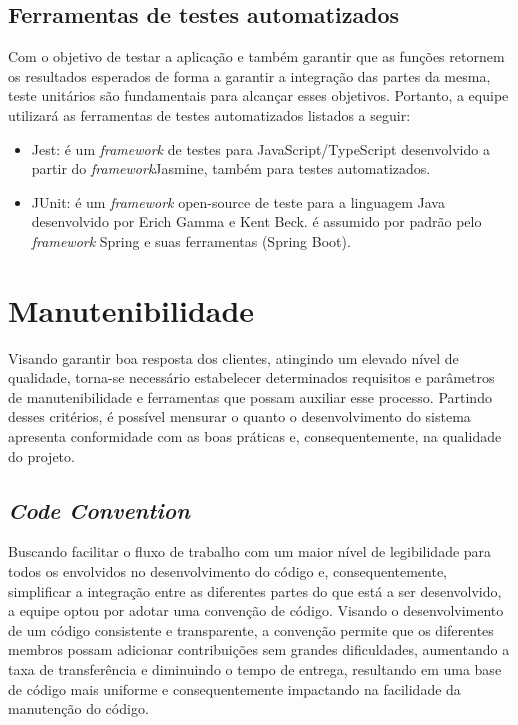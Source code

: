 \documentclass[
    12pt,               %
    openright,          %
    oneside,
    a4paper,            %
    BIBLATEX,           %
    TODO,               %
    english,            %
    brazil              %
    ]{ifsp-spo-inf-ctds}
\begin{document}
        \subsection{Ferramentas de testes automatizados}
        
            Com o objetivo de testar a aplicação e também garantir que as funções retornem os resultados esperados de forma a garantir a integração das partes da mesma, teste unitários são fundamentais para alcançar esses objetivos. Portanto, a equipe utilizará as ferramentas de testes automatizados listados a seguir:
            
            \begin{itemize}
                \item Jest: é um \emph{framework} de testes para JavaScript/TypeScript desenvolvido a partir do \emph{framework}Jasmine, também para testes automatizados.
                \item JUnit: é um \emph{framework} open-source de teste para a linguagem Java desenvolvido por Erich Gamma e Kent Beck. é assumido por padrão pelo \emph{framework} Spring e suas ferramentas (Spring Boot).
            \end{itemize}    




    \section{Manutenibilidade}
    Visando garantir boa resposta dos clientes, atingindo um elevado nível de qualidade, torna-se necessário estabelecer determinados requisitos e parâmetros de manutenibilidade e ferramentas que possam auxiliar esse processo. Partindo desses critérios, é possível mensurar o quanto o desenvolvimento do sistema apresenta conformidade com as boas práticas e, consequentemente, na qualidade do projeto.

        \subsection{\emph{Code Convention}}
        Buscando facilitar o fluxo de trabalho com um maior nível de legibilidade para todos os envolvidos no desenvolvimento do código e, consequentemente, simplificar a integração entre as diferentes partes do que está a ser desenvolvido, a equipe optou por adotar uma convenção de código. Visando o desenvolvimento de um código consistente e transparente, a convenção permite que os diferentes membros possam adicionar contribuições sem grandes dificuldades, aumentando a taxa de transferência e diminuindo o tempo de entrega, resultando em uma base de código mais uniforme e consequentemente impactando na facilidade da manutenção do código.
\end{document}
